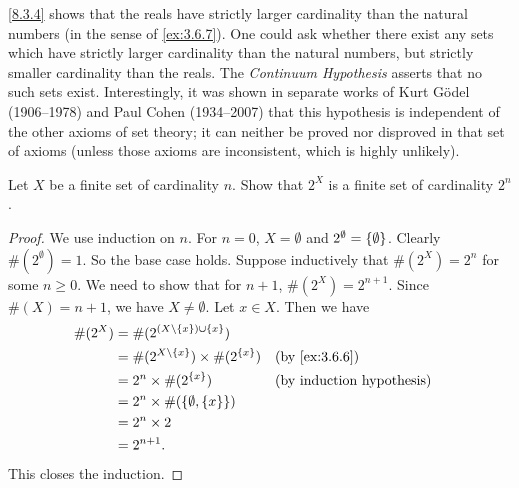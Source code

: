 \setcounter{thm}{5}
\begin{rmk}\label{8.3.6}
  \cref{8.3.4} shows that the reals have strictly larger cardinality than the natural numbers (in the sense of \cref{ex:3.6.7}).
  One could ask whether there exist any sets which have strictly larger cardinality than the natural numbers, but strictly smaller cardinality than the reals.
  The \emph{Continuum Hypothesis} asserts that no such sets exist.
  Interestingly, it was shown in separate works of Kurt Gödel (1906--1978) and Paul Cohen (1934--2007) that this hypothesis is independent of the other axioms of set theory;
  it can neither be proved nor disproved in that set of axioms
  (unless those axioms are inconsistent, which is highly unlikely).
\end{rmk}

\exercisesection

\begin{ex}\label{ex:8.3.1}
  Let \(X\) be a finite set of cardinality \(n\).
  Show that \(2^X\) is a finite set of cardinality \(2^n\).
\end{ex}

\begin{proof}
  We use induction on \(n\).
  For \(n = 0\), \(X = \emptyset\) and \(2^{\emptyset} = \left\lbrace\emptyset\right\rbrace\).
  Clearly \(\#(2^{\emptyset}) = 1\).
  So the base case holds.
  Suppose inductively that \(\#(2^X) = 2^n\) for some \(n \geq 0\).
  We need to show that for \(n + 1\), \(\#(2^X) = 2^{n + 1}\).
  Since \(\#(X) = n + 1\), we have \(X \neq \emptyset\).
  Let \(x \in X\).
  Then we have
  \begin{align*}
    \#(2^X) & = \#(2^{(X \setminus \set{x}) \cup \set{x}})                            \\
            & = \#(2^{X \setminus \set{x}}) \times \#(2^{\set{x}}) &  & \by{ex:3.6.6} \\
            & = 2^n \times \#(2^{\set{x}})                         &  & \byIH         \\
            & = 2^n \times \#(\set{\emptyset, \set{x}})                               \\
            & = 2^n \times 2                                                          \\
            & = 2^{n + 1}.
  \end{align*}
  This closes the induction.
\end{proof}

